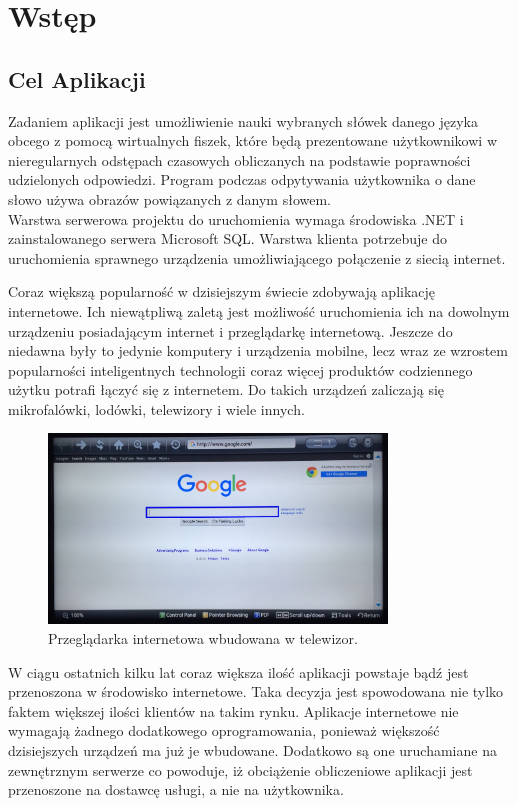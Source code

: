 {\let\cleardoublepage\relax \chapter{Wstęp}}
\label{cha:wstep}
\section{Cel Aplikacji}


Zadaniem aplikacji jest umożliwienie nauki wybranych słówek danego języka obcego z pomocą wirtualnych fiszek, które będą prezentowane użytkownikowi w nieregularnych odstępach czasowych obliczanych na podstawie poprawności udzielonych odpowiedzi. Program podczas odpytywania użytkownika o dane słowo używa obrazów powiązanych z danym słowem. 
\\
Warstwa serwerowa projektu do uruchomienia wymaga środowiska .NET i zainstalowanego serwera Microsoft SQL. Warstwa klienta potrzebuje do uruchomienia sprawnego urządzenia umożliwiającego połączenie z siecią internet.



Coraz większą popularność w dzisiejszym świecie zdobywają aplikację internetowe. Ich niewątpliwą zaletą jest możliwość uruchomienia ich na dowolnym urządzeniu posiadającym internet i przeglądarkę internetową. Jeszcze do niedawna były to jedynie komputery i urządzenia mobilne, lecz wraz ze wzrostem popularności inteligentnych technologii coraz więcej produktów codziennego użytku potrafi łączyć się z internetem. Do takich urządzeń zaliczają się mikrofalówki, lodówki, telewizory i wiele innych.

\begin{figure}[h]
	\centering
	\includegraphics[height=50.5mm]{images/Browser.jpg}
	 \caption{Przeglądarka internetowa wbudowana w telewizor.}
\end{figure}


W ciągu ostatnich kilku lat coraz większa ilość aplikacji powstaje bądź jest przenoszona w środowisko internetowe. Taka decyzja jest spowodowana nie tylko faktem większej ilości klientów na takim rynku. Aplikacje internetowe nie wymagają żadnego dodatkowego oprogramowania, ponieważ większość dzisiejszych urządzeń ma już je wbudowane. Dodatkowo są one uruchamiane na zewnętrznym serwerze co powoduje, iż obciążenie obliczeniowe aplikacji jest przenoszone na dostawcę usługi, a nie na użytkownika. 

